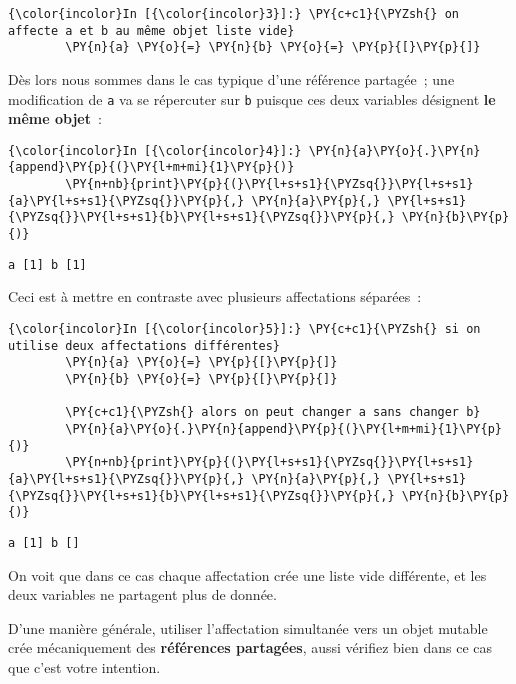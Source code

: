     \begin{Verbatim}[commandchars=\\\{\}]
{\color{incolor}In [{\color{incolor}3}]:} \PY{c+c1}{\PYZsh{} on affecte a et b au même objet liste vide}
        \PY{n}{a} \PY{o}{=} \PY{n}{b} \PY{o}{=} \PY{p}{[}\PY{p}{]}
\end{Verbatim}


    Dès lors nous sommes dans le cas typique d'une référence partagée~; une
modification de \texttt{a} va se répercuter sur \texttt{b} puisque ces
deux variables désignent \textbf{le même objet}~:

    \begin{Verbatim}[commandchars=\\\{\}]
{\color{incolor}In [{\color{incolor}4}]:} \PY{n}{a}\PY{o}{.}\PY{n}{append}\PY{p}{(}\PY{l+m+mi}{1}\PY{p}{)}
        \PY{n+nb}{print}\PY{p}{(}\PY{l+s+s1}{\PYZsq{}}\PY{l+s+s1}{a}\PY{l+s+s1}{\PYZsq{}}\PY{p}{,} \PY{n}{a}\PY{p}{,} \PY{l+s+s1}{\PYZsq{}}\PY{l+s+s1}{b}\PY{l+s+s1}{\PYZsq{}}\PY{p}{,} \PY{n}{b}\PY{p}{)}
\end{Verbatim}


    \begin{Verbatim}[commandchars=\\\{\}]
a [1] b [1]

    \end{Verbatim}

    Ceci est à mettre en contraste avec plusieurs affectations séparées~:

    \begin{Verbatim}[commandchars=\\\{\}]
{\color{incolor}In [{\color{incolor}5}]:} \PY{c+c1}{\PYZsh{} si on utilise deux affectations différentes}
        \PY{n}{a} \PY{o}{=} \PY{p}{[}\PY{p}{]}
        \PY{n}{b} \PY{o}{=} \PY{p}{[}\PY{p}{]}
        
        \PY{c+c1}{\PYZsh{} alors on peut changer a sans changer b}
        \PY{n}{a}\PY{o}{.}\PY{n}{append}\PY{p}{(}\PY{l+m+mi}{1}\PY{p}{)}
        \PY{n+nb}{print}\PY{p}{(}\PY{l+s+s1}{\PYZsq{}}\PY{l+s+s1}{a}\PY{l+s+s1}{\PYZsq{}}\PY{p}{,} \PY{n}{a}\PY{p}{,} \PY{l+s+s1}{\PYZsq{}}\PY{l+s+s1}{b}\PY{l+s+s1}{\PYZsq{}}\PY{p}{,} \PY{n}{b}\PY{p}{)}
\end{Verbatim}


    \begin{Verbatim}[commandchars=\\\{\}]
a [1] b []

    \end{Verbatim}

    On voit que dans ce cas chaque affectation crée une liste vide
différente, et les deux variables ne partagent plus de donnée.

    D'une manière générale, utiliser l'affectation simultanée vers un objet
mutable crée mécaniquement des \textbf{références partagées}, aussi
vérifiez bien dans ce cas que c'est votre intention.


    
    
    
